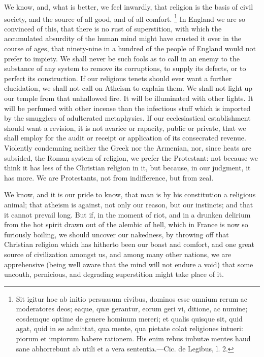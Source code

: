 We know, and, what is better, we feel inwardly, that religion is the basis of civil society, and the source of all good, and of all comfort.
\footnote{ Sit igitur hoc ab initio persuasum civibus, dominos esse omnium rerum ac moderatores deos; eaque, quæ gerantur, eorum geri vi, ditione, ac numine; eosdemque optime de genere hominum mereri; et qualis quisque sit, quid agat, quid in se admittat, qua mente, qua pietate colat religiones intueri: piorum et impiorum habere rationem. His enim rebus imbutæ mentes haud sane abhorrebunt ab utili et a vera sententia.—Cic. de Legibus, l. 2.}
 In England we are so convinced of this, that there is no rust of superstition, with which the accumulated absurdity of the human mind might have crusted it over in the course of ages, that ninety-nine in a hundred of the people of England would not prefer to impiety. We shall never be such fools as to call in an enemy to the substance of any system to remove its corruptions, to supply its defects, or to perfect its construction. If our religious tenets should ever want a further elucidation, we shall not call on Atheism to explain them. We shall not light up our temple from that unhallowed fire. It will be illuminated with other lights. It will be perfumed with other incense than the infectious stuff which is imported by the smugglers of adulterated metaphysics. If our ecclesiastical establishment should want a revision, it is not avarice or rapacity, public or private, that we shall employ for the audit or receipt or application of its consecrated revenue. Violently condemning neither the Greek nor the Armenian, nor, since heats are subsided, the Roman system of religion, we prefer the Protestant: not because we think it has less of the Christian religion in it, but because, in our judgment, it has more. We are Protestants, not from indifference, but from zeal.

We know, and it is our pride to know, that man is by his constitution a religious animal; that atheism is against, not only our reason, but our instincts; and that it cannot prevail long. But if, in the moment of riot, and in a drunken delirium from the hot spirit drawn out of the alembic of hell, which in France is now so furiously boiling, we should uncover our nakedness, by throwing off that Christian religion which has hitherto been our boast and comfort, and one great source of civilization amongst us, and among many other nations, we are apprehensive (being well aware that the mind will not endure a void) that some uncouth, pernicious, and degrading superstition might take place of it.


